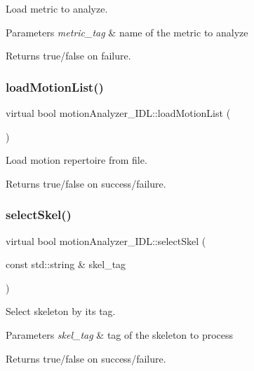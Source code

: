 Load metric to analyze. 


\begin{DoxyParams}{Parameters}
{\em metric\+\_\+tag} & name of the metric to analyze \\
\hline
\end{DoxyParams}
\begin{DoxyReturn}{Returns}
true/false on failure. 
\end{DoxyReturn}
\mbox{\label{classmotionAnalyzer__IDL_af06e1e8fd5ca8bee17ee69e5e61564af}} 
\subsubsection{\texorpdfstring{loadMotionList()}{loadMotionList()}}
{\footnotesize\ttfamily virtual bool motion\+Analyzer\+\_\+\+I\+D\+L\+::load\+Motion\+List (\begin{DoxyParamCaption}{ }\end{DoxyParamCaption})\hspace{0.3cm}{\ttfamily [virtual]}}



Load motion repertoire from file. 

\begin{DoxyReturn}{Returns}
true/false on success/failure. 
\end{DoxyReturn}
\mbox{\label{classmotionAnalyzer__IDL_a158f8a856611aa5d4bcab9adc9c67a5d}} 
\subsubsection{\texorpdfstring{selectSkel()}{selectSkel()}}
{\footnotesize\ttfamily virtual bool motion\+Analyzer\+\_\+\+I\+D\+L\+::select\+Skel (\begin{DoxyParamCaption}\item[{const std\+::string \&}]{skel\+\_\+tag }\end{DoxyParamCaption})\hspace{0.3cm}{\ttfamily [virtual]}}



Select skeleton by its tag. 


\begin{DoxyParams}{Parameters}
{\em skel\+\_\+tag} & tag of the skeleton to process \\
\hline
\end{DoxyParams}
\begin{DoxyReturn}{Returns}
true/false on success/failure. 
\end{DoxyReturn}
\mbox{\label{classmotionAnalyzer__IDL_af1a381d5b99e8a14d20b74a6444743f8}} 
